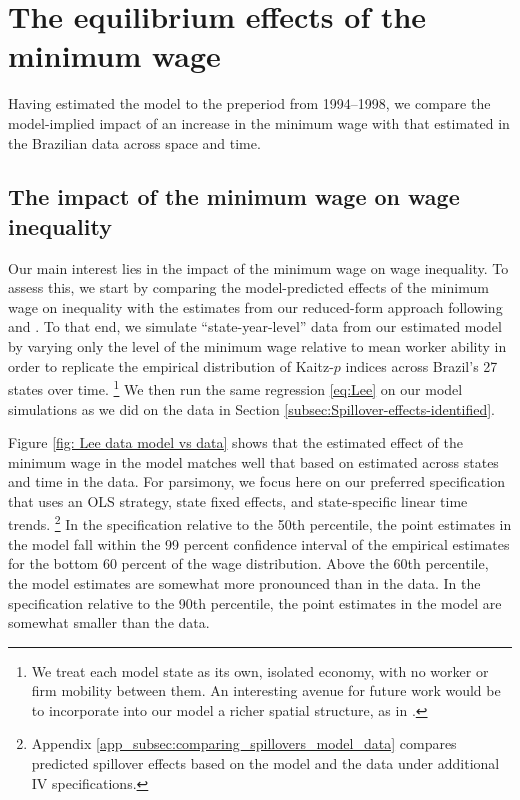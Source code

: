 
\section{The equilibrium effects of the minimum wage\label{SECTION: Results}}

Having estimated the model to the preperiod from 1994--1998, we compare the model-implied impact of an increase in the minimum wage with that estimated in the Brazilian data across space and time.

\subsection{The impact of the minimum wage on wage inequality\label{subsec:spillovers_model_data}}

Our main interest lies in the impact of the minimum wage on wage inequality. To assess this, we start by comparing the model-predicted effects of the minimum wage on inequality with the estimates from our reduced-form approach following \citet{Lee1999} and \citet{Autor2016}. To that end, we simulate ``state-year-level'' data from our estimated model by varying only the level of the minimum wage relative to mean worker ability in order to replicate the empirical distribution of Kaitz-$p$ indices across Brazil's 27 states over time.%
%
\footnote{We treat each model state as its own, isolated economy, with no worker or firm mobility between them. An interesting avenue for future work would be to incorporate into our model a richer spatial structure, as in \citet{Zhang2018}.} %
%
We then run the same regression \eqref{eq:Lee} on our model simulations as we did on the data in Section \ref{subsec:Spillover-effects-identified}.

Figure \ref{fig: Lee data model vs data} shows that the estimated effect of the minimum wage in the model matches well that based on estimated across states and time in the data. For parsimony, we focus here on our preferred specification that uses an OLS strategy, state fixed effects, and state-specific linear time trends.%
%
\footnote{Appendix \ref{app_subsec:comparing_spillovers_model_data} compares predicted spillover effects based on the model and the data under additional IV specifications.} %
%
In the specification relative to the 50th percentile, the point estimates in the model fall within the 99 percent confidence interval of the empirical estimates for the bottom 60 percent of the wage distribution. Above the 60th percentile, the model estimates are somewhat more pronounced than in the data. In the specification relative to the 90th percentile, the point estimates in the model are somewhat smaller than the data.

